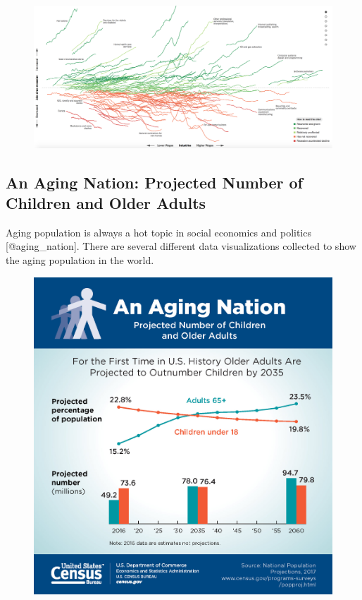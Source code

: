 \documentclass[]{book}
\theoremstyle{definition}
\theoremstyle{definition}
\theoremstyle{definition}
\theoremstyle{remark}
\begin{document}
\begin{figure}
\centering
\includegraphics{images/recession_jobs.png}
\caption{}
\end{figure}

\subsection{An Aging Nation: Projected Number of Children and Older
Adults}\label{an-aging-nation-projected-number-of-children-and-older-adults}

Aging population is always a hot topic in social economics and politics
{[}@aging\_nation{]}. There are several different data visualizations
collected to show the aging population in the world.

\begin{figure}
\centering
\includegraphics{images/aging_nation.jpg}
\caption{}
\end{figure}
\end{document}
